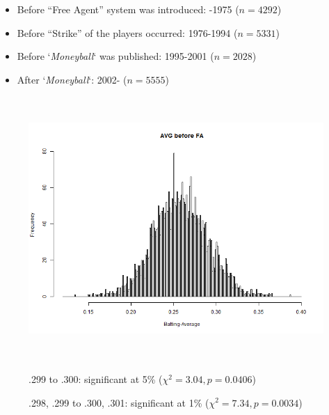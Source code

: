 \documentclass[dvipdfmx]{article}
\begin{document}
  \begin{itemize}
    \item Before ``Free Agent'' system was introduced: -1975
    ($n = 4292$)

    \item Before ``Strike'' of the players occurred: 1976-1994
    ($n = 5331$)

    \item Before `\textit{Moneyball}` was published: 1995-2001
    ($n = 2028$)

    \item After `\textit{Moneyball}`: 2002-
    ($n = 5555$)
  \end{itemize}

 \begin{figure}[H]
   \centering

   \includegraphics[width = 14cm, height = 10cm]{graphs/AVG_bffa.png}

   .299 to .300: significant at 5\% ($\chi^2 = 3.04, p = 0.0406$)

   .298, .299 to .300, .301: significant at 1\% ($\chi^2 = 7.34, p = 0.0034$)
 \end{figure}
\end{document}

